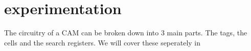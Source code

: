 \section{experimentation}
The circuitry of a CAM can be broken down into 3 main parts. The tags, the cells and the search registers. 
We will cover these seperately in 
